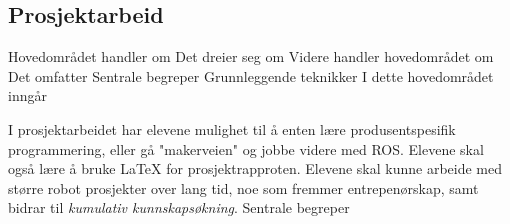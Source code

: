 \subsection*{Prosjektarbeid}

    Hovedområdet handler om
    Det dreier seg om
    Videre handler hovedområdet om
    Det omfatter
    Sentrale begreper
    Grunnleggende teknikker
    I dette hovedområdet inngår

    I prosjektarbeidet har elevene mulighet til å enten lære produsentspesifik programmering, eller gå "makerveien" og jobbe videre med ROS. Elevene skal også lære å bruke LaTeX for prosjektrapproten. Elevene skal kunne arbeide med større robot prosjekter over lang tid, noe som fremmer entrepenørskap, samt bidrar til \emph{kumulativ kunnskapsøkning}.
     Sentrale begreper
